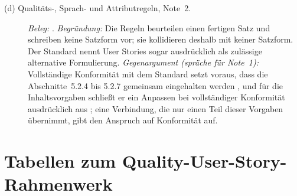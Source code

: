 \documentclass[11pt,a4paper]{report}
\begin{document}
\begin{description}
  \item[(d) Qualitäts-, Sprach- und Attributregeln, Note~2.]
  \emph{Beleg:} \cite[Abschn.~5.2.4 NOTE~2 und
  5.2.5--5.2.7]{iso29148}.
  \emph{Begründung:} Die Regeln beurteilen einen fertigen Satz und
  schreiben keine Satzform vor; sie kollidieren deshalb mit keiner
  Satzform. Der Standard nennt User Stories sogar ausdrücklich als
  zulässige alternative Formulierung.
  \emph{Gegenargument (spräche für Note~1):} Vollständige Konformität
  mit dem Standard setzt voraus, dass die Abschnitte~5.2.4 bis 5.2.7
  gemeinsam eingehalten werden \cite[Abschn.~4.2]{iso29148}, und für die
  Inhaltsvorgaben schließt er ein Anpassen bei vollständiger Konformität
  ausdrücklich aus \cite[Anhang~C.1]{iso29148}; eine Verbindung, die nur
  einen Teil dieser Vorgaben übernimmt, gibt den Anspruch auf
  Konformität auf.
\end{description}



\section{Tabellen zum Quality-User-Story-Rahmenwerk}
\label{sec:anhang-qus}
\end{document}
